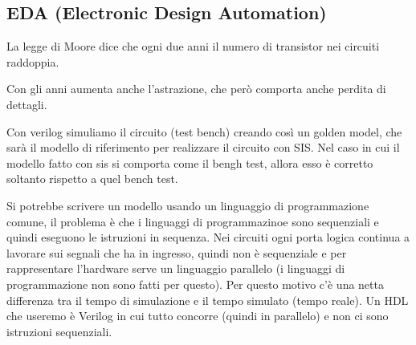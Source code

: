 \documentclass[a4paper]{article}
\theoremstyle{break}
\theoremstyle{break}
\theoremstyle{break}
\theoremstyle{break}
\begin{document}
\subsection{EDA (Electronic Design Automation)}
La legge di Moore dice che ogni due anni il numero di transistor nei circuiti raddoppia.

Con gli anni aumenta anche l'astrazione, che però comporta anche perdita di dettagli.

Con verilog simuliamo il circuito (test bench) creando così un golden model, che sarà il
modello di riferimento per realizzare il circuito con SIS. Nel caso in cui il modello fatto con sis
si comporta come il bengh test, allora esso è corretto soltanto rispetto a quel bench test.

Si potrebbe scrivere un modello usando un linguaggio di programmazione comune, il problema è che 
i linguaggi di programmazinoe sono sequenziali e quindi eseguono le istruzioni in sequenza.
Nei circuiti ogni porta logica continua a lavorare sui segnali che ha in ingresso, quindi
non è sequenziale e per rappresentare l'hardware serve un linguaggio parallelo (i linguaggi di 
programmazione non sono fatti per questo). Per questo motivo c'è una netta differenza tra il tempo
di simulazione e il tempo simulato (tempo reale). Un HDL che useremo è Verilog in cui tutto concorre
(quindi in parallelo) e non ci sono istruzioni sequenziali.
\end{document}
